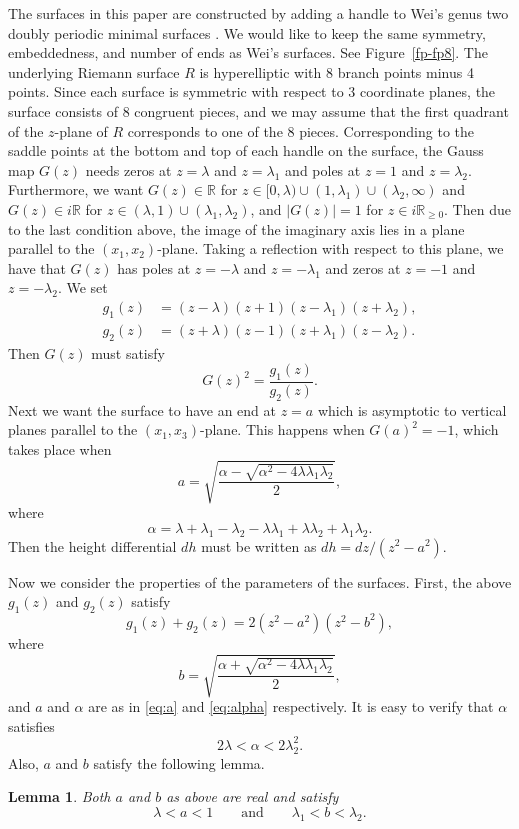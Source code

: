 \documentclass[11pt]{amsart}
\numberwithin{equation}{section}
\numberwithin{figure}{section}
\theoremstyle{plain} %
\newtheorem{lemma}[theorem]{Lemma}
\theoremstyle{definition} %
\begin{document}
The surfaces in this paper are constructed by adding a handle to Wei's genus two doubly periodic minimal surfaces \cite{wei2}. 
We would like to keep the same symmetry, embeddedness, and number of ends as Wei's surfaces. 
See Figure~\ref{fp-fp8}. 
The underlying Riemann surface $R$ is hyperelliptic with 8 branch points minus 4 points. 
Since each surface is symmetric with respect to 3 coordinate planes, the surface consists of 8 congruent pieces, and we may assume that the first quadrant of the $z$-plane of $R$ corresponds to one of the 8 pieces.  
Corresponding to the saddle points at the bottom and top of each handle on the surface, the Gauss map $G(z)$ needs zeros at $z=\lambda$ and $z=\lambda_1$ and poles at $z=1$ and $z=\lambda_2$. 
Furthermore, we want $G(z)\in\mathbb{R}$ for $z\in [0,\lambda)\cup (1,\lambda_1)\cup (\lambda_2,\infty)$ and 
$G(z)\in i\mathbb{R}$ for $z\in (\lambda,1)\cup (\lambda_1,\lambda_2)$, 
and $|G(z)|=1$ for $z\in i\mathbb{R}_{\ge 0}$. 
Then due to the last condition above, the image of the imaginary axis lies in a plane parallel to the $(x_1,x_2)$-plane. 
Taking a reflection with respect to this plane, we have that $G(z)$ has poles at $z=-\lambda$ and $z=-\lambda_1$ and zeros at $z=-1$ and $z=-\lambda_2$. 
We set 
\begin{align*}
g_1(z)&=(z-\lambda)(z+1)(z-\lambda_1)(z+\lambda_2), \\
g_2(z)&=(z+\lambda)(z-1)(z+\lambda_1)(z-\lambda_2). 
\end{align*}Then $G(z)$ must satisfy 
\[
G(z)^2=\frac{g_1(z)}{g_2(z)}. 
\]
Next we want the surface to have an end at $z=a$ which is asymptotic to vertical planes parallel to the $(x_1,x_3)$-plane.  
This happens when $G(a)^2=-1$, which takes place when 
\begin{equation}\label{eq:a}
a=\sqrt{\dfrac{\alpha -\sqrt{\alpha^2-4\lambda\lambda_1\lambda_2}}{2}},
\end{equation}
where 
\begin{equation}\label{eq:alpha}
\alpha=\lambda+\lambda_1-\lambda_2-\lambda\lambda_1+\lambda\lambda_2+\lambda_1\lambda_2.
\end{equation}
Then the height differential $dh$ must be written as 
$
dh=dz/(z^2-a^2).
$

Now we consider the properties of the parameters of the surfaces. 
First, the above $g_1(z)$ and $g_2(z)$ satisfy  
\[
g_1(z)+g_2(z)=2(z^2-a^2)(z^2-b^2), 
\]
where 
\begin{equation}\label{eq:b}
  b=\sqrt{\dfrac{\alpha +\sqrt{\alpha^2-4\lambda\lambda_1\lambda_2}}{2}},
\end{equation}
and $a$ and $\alpha$ are as in \eqref{eq:a} and \eqref{eq:alpha} respectively.
It is easy to verify that $\alpha$ satisfies 
\[
2\lambda < \alpha < 2\lambda_2^2. 
\] 
Also, $a$ and $b$ satisfy the following lemma. 
\begin{lemma}\label{lm:ab}
Both $a$ and $b$ as above are real and satisfy
\[
\lambda < a < 1
\qquad\text{and}\qquad
\lambda_1 < b < \lambda_2.
\]
\end{lemma}
\end{document}
